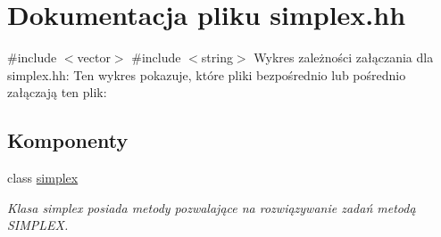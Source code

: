 \hypertarget{simplex_8hh}{\section{\-Dokumentacja pliku simplex.\-hh}
\label{simplex_8hh}
}
{\ttfamily \#include $<$vector$>$}\*
{\ttfamily \#include $<$string$>$}\*
\-Wykres zależności załączania dla simplex.\-hh\-:
\-Ten wykres pokazuje, które pliki bezpośrednio lub pośrednio załączają ten plik\-:
\subsection*{\-Komponenty}
\begin{DoxyCompactItemize}
\item 
class \hyperlink{classsimplex}{simplex}
\begin{DoxyCompactList}\small\item\em \-Klasa simplex posiada metody pozwalające na rozwiązywanie zadań metodą \-S\-I\-M\-P\-L\-E\-X. \end{DoxyCompactList}\end{DoxyCompactItemize}
